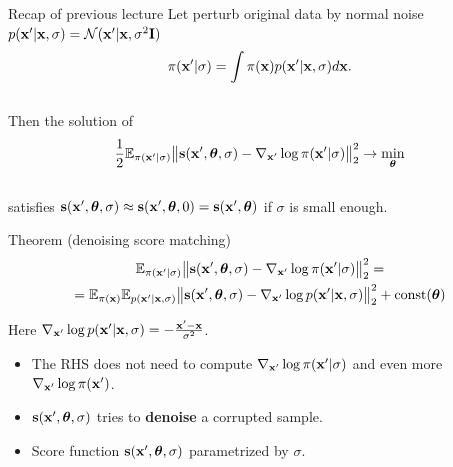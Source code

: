 \begin{frame}{Recap of previous lecture}
	Let perturb original data by normal noise $p(\mathbf{x}' | \mathbf{x}, \sigma) = \mathcal{N}(\mathbf{x}' | \mathbf{x}, \sigma^2 \mathbf{I})$
	\vspace{-0.3cm}
	\[
	\pi(\mathbf{x}' | \sigma) = \int \pi(\mathbf{x}) p(\mathbf{x}' | \mathbf{x}, \sigma) d\mathbf{x}.
	\]
	\vspace{-0.6cm} \\
	Then the solution of 
	\vspace{-0.2cm}
	\[
	\frac{1}{2} \mathbb{E}_{\pi(\mathbf{x}' | \sigma)}\bigl\| \mathbf{s}(\mathbf{x}', \boldsymbol{\theta}, \sigma) - \nabla_{\mathbf{x}'} \log \pi(\mathbf{x}' | \sigma) \bigr\|^2_2 \rightarrow \min_{\boldsymbol{\theta}}
	\]
	\vspace{-0.5cm} \\
	satisfies $\mathbf{s}(\mathbf{x}', \boldsymbol{\theta}, \sigma) \approx \mathbf{s}(\mathbf{x}', \boldsymbol{\theta}, 0) = \mathbf{s}(\mathbf{x}', \boldsymbol{\theta})$ if $\sigma$ is small enough.
	\begin{block}{Theorem (denoising score matching)}
		\vspace{-0.8cm}
		\begin{multline*}
			\mathbb{E}_{\pi(\mathbf{x}' | \sigma)}\bigl\| \mathbf{s}(\mathbf{x}', \boldsymbol{\theta}, \sigma) - \nabla_{\mathbf{x}'} \log \pi(\mathbf{x}' | \sigma) \bigr\|^2_2 = \\ = \mathbb{E}_{\pi(\mathbf{x})} \mathbb{E}_{p(\mathbf{x}' | \mathbf{x}, \sigma)}\bigl\| \mathbf{s}(\mathbf{x}', \boldsymbol{\theta}, \sigma) - \nabla_{\mathbf{x}'} \log p(\mathbf{x}' | \mathbf{x}, \sigma) \bigr\|^2_2 + \text{const}(\boldsymbol{\theta})
		\end{multline*}
		\vspace{-0.8cm}
	\end{block}
	Here $\nabla_{\mathbf{x}'} \log p(\mathbf{x}' | \mathbf{x}, \sigma) = - \frac{\mathbf{x}' - \mathbf{x}}{\sigma^2}$.
	\begin{itemize}
		\item The RHS does not need to compute $\nabla_{\mathbf{x}'} \log \pi(\mathbf{x}' | \sigma)$ and even more $\nabla_{\mathbf{x}'} \log \pi(\mathbf{x}')$.
		\item $\mathbf{s}(\mathbf{x}', \boldsymbol{\theta}, \sigma)$ tries to \textbf{denoise} a corrupted sample.
		\item Score function $\mathbf{s}(\mathbf{x}', \boldsymbol{\theta}, \sigma)$ parametrized by $\sigma$. 
	\end{itemize}
\end{frame}
